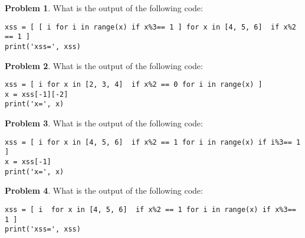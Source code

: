 \documentclass[10pt]{article}
\theoremstyle{definition}
\newtheorem{problem}{Problem}
\begin{document}
\begin{problem}
    What is the output of the following code:
\end{problem}
\begin{lstlisting}
xss = [ [ i for i in range(x) if x%3== 1 ] for x in [4, 5, 6]  if x%2 == 1 ]
print('xss=', xss)
\end{lstlisting}
\vspace{2.0in}



\begin{problem}
    What is the output of the following code:
\end{problem}
\begin{lstlisting}
xss = [ i for x in [2, 3, 4]  if x%2 == 0 for i in range(x) ]
x = xss[-1][-2]
print('x=', x)
\end{lstlisting}
\vspace{2.0in}


\newpage
\begin{problem}
    What is the output of the following code:
\end{problem}
\begin{lstlisting}
xss = [ i for x in [4, 5, 6]  if x%2 == 1 for i in range(x) if i%3== 1 ]
x = xss[-1]
print('x=', x)
\end{lstlisting}
\vspace{3.0in}


\begin{problem}
    What is the output of the following code:
\end{problem}
\begin{lstlisting}
xss = [ i  for x in [4, 5, 6]  if x%2 == 1 for i in range(x) if x%3== 1 ]
print('xss=', xss)
\end{lstlisting}
\vspace{2.0in}
\end{document}
